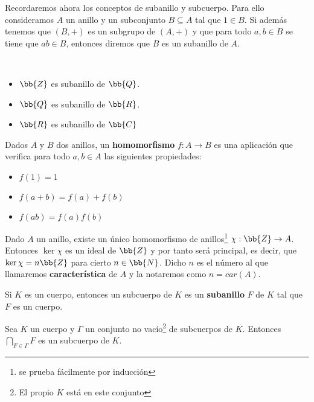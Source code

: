 Recordaremos ahora los conceptos de subanillo y subcuerpo. Para ello consideramos $A$ un anillo y un subconjunto $B\subseteq A$ tal que $1\in B$. Si además tenemos que $(B,+)$ es un subgrupo de $(A, +)$ y que para todo $a,b\in B$ se tiene que $ab\in B$, entonces diremos que $B$ es un subanillo de $A$.

\begin{ejemplo}\
    \begin{itemize}
        \item $\bb{Z}$ es subanillo de $\bb{Q}$.
        \item $\bb{Q}$ es subanillo de $\bb{R}$.
        \item $\bb{R}$ es subanillo de $\bb{C}$
    \end{itemize}
\end{ejemplo}

\begin{definicion}
    Dados $A$ y $B$ dos anillos, un \textbf{homomorfismo} $f:A\to B$ es una aplicación que verifica para todo $a,b\in A$ las siguientes propiedades:
    \begin{itemize}
        \item $f(1)=1$
        \item $f(a+b) = f(a) + f(b)$
        \item $f(ab) = f(a)f(b)$
    \end{itemize}
\end{definicion}

\begin{definicion}
    Dado $A$ un anillo, existe un único homomorfismo de anillos\footnote{se prueba fácilmente por inducción} $\chi:\bb{Z} \to A$. Entonces $\ker\chi$ es un ideal de $\bb{Z}$ y por tanto será principal, es decir, que $\ker\chi = n\bb{Z}$ para cierto $n\in \bb{N}$. Dicho $n$ es el número al que llamaremos \textbf{característica} de $A$ y la notaremos como $n=car(A)$.
\end{definicion}

\begin{definicion}[Subanillo]
    Si $K$ es un cuerpo, entonces un subcuerpo de $K$ es un \textbf{subanillo} $F$ de $K$ tal que $F$ es un cuerpo.
\end{definicion}

\begin{observacion}
    Sea $K$ un cuerpo y $\Gamma$ un conjunto no vacío\footnote{El propio $K$ está en este conjunto} de subcuerpos de $K$. Entonces $\bigcap\limits_{F\in\Gamma}F$ es un subcuerpo de $K$.
\end{observacion}

